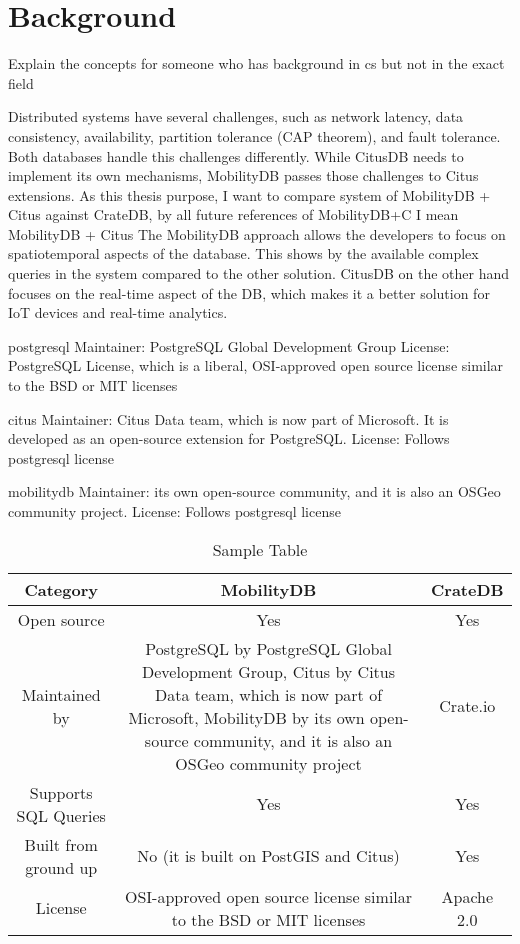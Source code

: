 \section{Background}
\label{cha:background}

Explain the concepts for someone who has background in cs but not in the exact field


Distributed systems have several challenges, such as network latency, data consistency, availability, partition tolerance (CAP theorem), and fault tolerance.
Both databases handle this challenges differently.
While CitusDB needs to implement its own mechanisms, MobilityDB passes those challenges to Citus extensions.
As this thesis purpose, I want to compare system of MobilityDB + Citus against CrateDB, by all future references of MobilityDB+C I mean MobilityDB + Citus
The MobilityDB approach allows the developers to focus on spatiotemporal aspects of the database.
This shows by the available complex queries in the system compared to the other solution.
CitusDB on the other hand focuses on the real-time aspect of the DB, which makes it a better solution for IoT devices and real-time analytics.


postgresql
Maintainer: PostgreSQL Global Development Group
License: PostgreSQL License, which is a liberal, OSI-approved open source license similar to the BSD or MIT licenses

citus
Maintainer: Citus Data team, which is now part of Microsoft. It is developed as an open-source extension for PostgreSQL.
License: Follows postgresql license

mobilitydb
Maintainer: its own open-source community, and it is also an OSGeo community project.
License: Follows postgresql license


\begin{table}[h]
  \centering
  \begin{tabular}{|c|c|c|}
    \hline
    Category & MobilityDB & CrateDB \\
    \hline
    Open source & Yes & Yes \\
    Maintained by & PostgreSQL by PostgreSQL Global Development Group, Citus by Citus Data team, which is now part of Microsoft, MobilityDB by its own open-source community, and it is also an OSGeo community project& Crate.io \\ 
    Supports SQL Queries & Yes & Yes \\
    Built from ground up & No (it is built on PostGIS and Citus) & Yes \\
    License & OSI-approved open source license similar to the BSD or MIT licenses & Apache 2.0 \\
    \hline
  \end{tabular}
  \caption{Sample Table}
\end{table}
